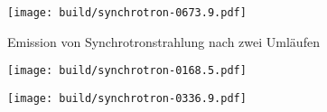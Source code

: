 \documentclass[11pt,a4paper]{article}
\begin{document}
        \begin{figure}[h]
            \centering
            \texttt{[image: build/synchrotron-0673.9.pdf]}
            \caption{Emission von Synchrotronstrahlung nach zwei Umläufen}
        \end{figure}

        \begin{figure}[h]
            \centering
            \texttt{[image: build/synchrotron-0168.5.pdf]}
        \end{figure}

        \begin{figure}[h]
            \centering
            \texttt{[image: build/synchrotron-0336.9.pdf]}
        \end{figure}
\end{document}
